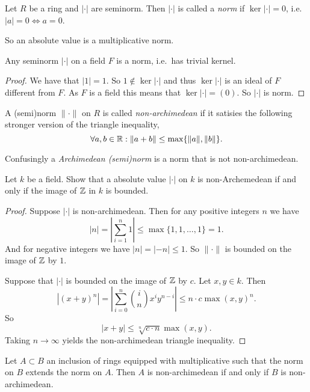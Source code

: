 \begin{definition}
	Let $R$ be a ring and $|\cdot |$ are seminorm. 
	Then $|\cdot |$ is called a \emph{norm} if $\ker |\cdot | = 0$, i.e.\ $|a| = 0 \iff a = 0$. 
\end{definition}

So an absolute value is a multiplicative norm. 

\begin{lemma}
	Any seminorm $|\cdot |$ on a field $F$ is a norm, i.e.\ has trivial kernel. 
\end{lemma}
\begin{proof}
	We have that $|1| = 1$. So $1 \not\in \ker |\cdot |$ and thus $\ker |\cdot |$ is an ideal of $F$ different from $F$. 
	As $F$ is a field this means that $\ker |\cdot | = (0)$. So $|\cdot |$ is norm. 
\end{proof}

\begin{definition}
	A (semi)norm $\|\cdot \|$ on $R$ is called \emph{non-archimedean} if it satisies the following stronger version of the triangle inequality, \[
	\forall a, b \in \mathbb{R}: \|a + b\| \le \max \{\|a\|, \|b\|\} 
	.\] 

	Confusingly a \emph{Archimedean (semi)norm} is a norm that is not non-archimedean.
\end{definition}

\begin{exercise}
	Let $k$ be a field.
	Show that a absolute value  $|\cdot |$ on $k$ is non-Archemedean if and only if the image of $\mathbb{Z}$ in $k$ is bounded. 
\end{exercise}
\begin{proof}
	Suppose $|\cdot |$ is non-archimedean. Then for any positive integers $n$ we have \[
	|n| = \left|\sum_{i = 1}^{n} 1 \right| \le \max \{1, 1, \ldots, 1\}  = 1
	.\] 
	And for negative integers we have $|n| = |-n| \le 1$. So $\|\cdot \|$ is bounded on the image of $\mathbb{Z}$ by $1$. 


	Suppose that $|\cdot |$ is bounded on the image of $\mathbb{Z}$ by $c$. 
	Let $x, y \in k$. Then \[
		|(x + y)^{n}| = \left| \sum_{i = 0}^{n} \binom{i}{n} x ^{i} y ^{n-i}\right| \le n\cdot c \max(x, y)^{n}
	.\] 
	So \[
		|x + y| \le \sqrt[n]{c\cdot n}  \max(x, y)
	.\] 
	Taking $n \to \infty$ yields the non-archimedean triangle inequality. 
\end{proof}

\begin{corollary}
	Let $A \subset  B$ an inclusion of rings  equipped with multiplicative such that the norm on $B$ extends the norm on $A$. 
	Then $A$ is non-archimedean if and only if $B$ is non-archimedean. 
\end{corollary}

